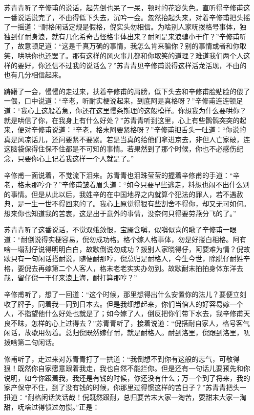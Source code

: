 \documentclass[12pt,UTF8]{ctexbook}
\begin{document}
{{{苏青青听了辛修甫的说话，起先倒也呆了一呆，顿时的花容失色。直听得辛修甫这一番说话说完了，不由得低下头去，沉吟一会。忽然抬起头来，对着辛修甫把头摇了一摇道：“耐格闲话定规是假格，倪实头勿相信。为啥别人家呒拨格号事体，独独到仔耐身浪，就有几化希奇古怪格事体出来？耐阿是来浪骗小干仵？”辛修甫听了，故意顿足道：“这是千真万确的事情，我怎么肯来骗你？别的事情或者和你取笑，哄哄你也还罢了。那有这样的风火事儿都和你取笑的道理？难道我们两个人这样的要好，你还信不过我的说话么？”苏青青见辛修甫说得这样活龙活现，不由的也有几分相信起来。

踌躇了一会，慢慢的走过来，扶着辛修甫的肩膀，低下头去和辛修甫脸贴脸的偎了一偎，口中说道：“辛老，听耐实梗说起来，到底阿是真格呀？”辛修甫连连顿足道：“我心上这般着急，你还在这里慢条斯理的这般模样。你想我为什么要哄你？就是哄信了你，在我身上有什么好处？”苏青青听到这里，心上有些鹘鹘突突的起来，便对辛修甫说道：“辛老，格末阿要紧格呀？”辛修甫把舌头一吐道：“你说的真是风凉话儿，还问要紧不要紧。若是当真的给他们拿进京去，非但人亡家破，连这脑袋保得住保不住都是不可知的事情。若果然到了那个时候，你也不必感伤纪念，只要你心上记着我这样一个人就是了。”

辛修甫一面说着，不觉流下泪来。苏青青也泪珠莹莹的握着辛修甫的手道：“辛老，格末那哼介？”辛修甫皱着眉头道：“如今只要早些逃走，料想也闹不出什么别的事情。但是从此以后，我姓辛的在中国地界之内就算个犯法的罪人，若不遇赦典，是一生一世不得回来的了。我心上原觉得狠有些割舍不得你，却又无可如何。想来你也知道我的苦衷，这是出于意外的事情，没奈何只得要劳燕分飞的了。”

苏青青听了这番说话，不觉双蛾敛恨，宝靥含嗔，似嗔似喜的瞅了辛修甫一眼道：“耐倒说得实梗容易，倪勿成功格。格个嫁人格事体，勿是好搂白相格。阿有啥一塌刮仔说得明明白白，故歇倒说勿成功？拨别人家晓得仔，阿要难为情？倪故歇只有一句闲话搭耐说，随便耐那哼，倪总归是耐格人，今生今世，除脱仔耐姓辛格，要倪去再嫁第二个人客人，格末老老实实办勿到。故歇耐末拍拍身体东洋去哉，留仔倪一干仔来浪上海，耐打算那哼？”

辛修甫听了，想了一回道：“这个时候，那里想得出什么安置你的法儿？要便立刻收了牌子，同着我一同到日本去。但是我细想起来，你们当倌人的好容易嫁一个人，不指望他什么好处也就是了；如今嫁了人，倒反把你们带下水去，我辛修甫天良不昧，怎样的心上过得去？”苏青青听了，接着说道：“倪搭耐自家人，格号客气闲话，故歇用勿着。总归倪既然嫁仔耐，就是耐格人。耐到洛里，倪跟到洛里，呒拨啥第二句闲话。

修甫听了，走过来对苏青青打了一拱道：“我倒想不到你有这般的志气，可敬得狠！既然你自家愿意跟着我走，我也自然不能拦你。但是还有一句话儿要预先和你说明，如今你跟着我，我还是有钱的时候，你还没有什么；万一个到了将来，我的家产保守不住，到了没有钱的时候，你那里过得惯这样的苦日子？”苏青青把头一扭道：“耐格闲话笑话哉！倪既然跟耐，总归要苦末大家一淘苦，要甜末大家一淘甜，呒啥过得惯过勿惯。”正是：

}}}
\end{document}
